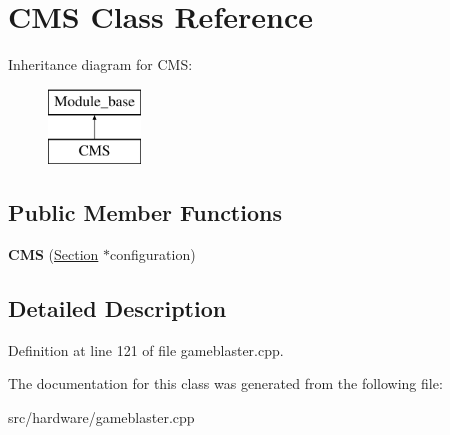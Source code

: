 \hypertarget{classCMS}{\section{C\-M\-S Class Reference}
\label{classCMS}
}
Inheritance diagram for C\-M\-S\-:\begin{figure}[H]
\begin{center}
\leavevmode
\includegraphics[height=2.000000cm]{classCMS}
\end{center}
\end{figure}
\subsection*{Public Member Functions}
\begin{DoxyCompactItemize}
\item 
\hypertarget{classCMS_afc0f43ea744137735477433ee764c729}{{\bfseries C\-M\-S} (\hyperlink{classSection}{Section} $\ast$configuration)}\label{classCMS_afc0f43ea744137735477433ee764c729}

\end{DoxyCompactItemize}


\subsection{Detailed Description}


Definition at line 121 of file gameblaster.\-cpp.



The documentation for this class was generated from the following file\-:\begin{DoxyCompactItemize}
\item 
src/hardware/gameblaster.\-cpp\end{DoxyCompactItemize}
